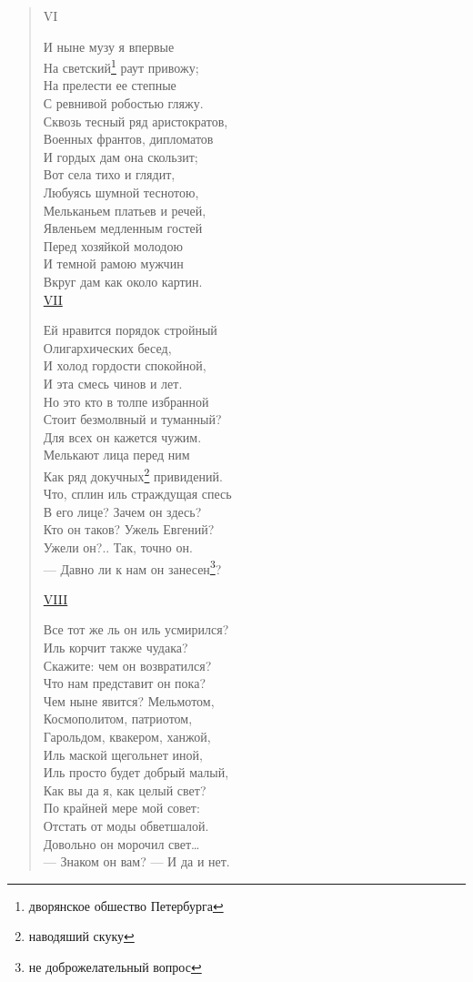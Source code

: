 \begin{verse}
VI

И ныне музу я впервые\\
На светский\footnote{дворянское обшество Петербурга} раут привожу;\\
На прелести ее степные\\
С ревнивой робостью гляжу.\\
Сквозь тесный ряд аристократов,\\
Военных франтов, дипломатов\\
И гордых дам она скользит;\\
Вот села тихо и глядит,\\
Любуясь шумной теснотою,\\
Мельканьем платьев и речей,\\
Явленьем медленным гостей\\
Перед хозяйкой молодою\\
И темной рамою мужчин\\
Вкруг дам как около картин.\\

\hyperref[societa]{VII}

Ей нравится порядок стройный\\
Олигархических бесед,\\
И холод гордости спокойной,\\
И эта смесь чинов и лет.\\
Но это кто в толпе избранной\\
Стоит безмолвный и туманный?\\
Для всех он кажется чужим.\\
Мелькают лица перед ним\\
Как ряд докучных\footnote{наводяший скуку} привидений.\\
Что, сплин иль страждущая спесь\\
В его лице? Зачем он здесь?\\
Кто он таков? Ужель Евгений?\\
Ужели он?.. Так, точно он.\\
— Давно ли к нам он занесен\footnote{не доброжелательный вопрос}?

\hyperref[oneghin]{VIII}

Все тот же ль он иль усмирился?\\
Иль корчит также чудака?\\
Скажите: чем он возвратился?\\
Что нам представит он пока?\\
Чем ныне явится? Мельмотом,\\
Космополитом, патриотом,\\
Гарольдом, квакером, ханжой,\\
Иль маской щегольнет иной,\\
Иль просто будет добрый малый,\\
Как вы да я, как целый свет?\\
По крайней мере мой совет:\\
Отстать от моды обветшалой.\\
Довольно он морочил свет…\\
— Знаком он вам? — И да и нет.


\end{verse}
